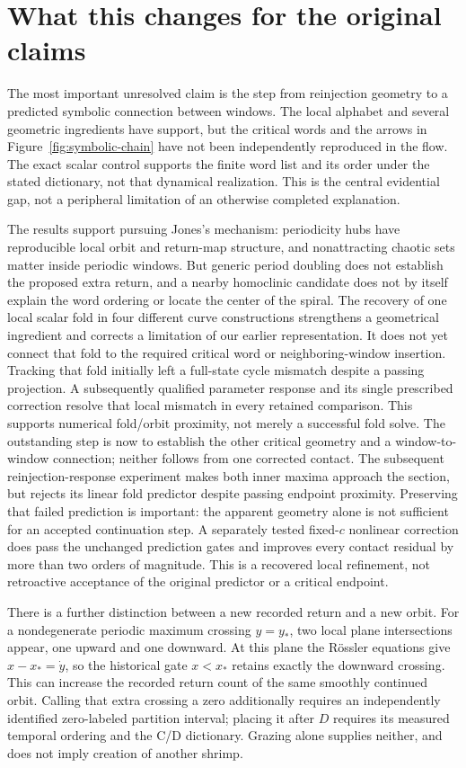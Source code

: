\section{What this changes for the original claims}
\label{sec:claims}

The most important unresolved claim is the step from reinjection geometry
to a predicted symbolic connection between windows. The local alphabet and
several geometric ingredients have support, but the critical words and the
arrows in Figure~\ref{fig:symbolic-chain} have not been independently
reproduced in the flow. The exact scalar control supports the finite word
list and its order under the stated dictionary, not that dynamical realization.
This is the central evidential gap, not a peripheral limitation
of an otherwise completed explanation.

The results support pursuing Jones's mechanism: periodicity hubs have
reproducible local orbit and return-map structure, and nonattracting chaotic
sets matter inside periodic windows. But generic period doubling does not
establish the proposed extra return, and a nearby homoclinic candidate does
not by itself explain the word ordering or locate the center of the spiral.
The recovery of one local scalar fold in four different curve constructions
strengthens a geometrical ingredient and corrects a limitation of our earlier
representation. It does not yet connect that fold to the required critical
word or neighboring-window insertion.
Tracking that fold initially left a full-state cycle mismatch despite a
passing projection. A subsequently qualified parameter response and its
single prescribed correction resolve that local mismatch in every retained
comparison. This supports numerical fold/orbit proximity, not merely a
successful fold solve. The outstanding step is now to establish the other
critical geometry and a window-to-window connection; neither follows from
one corrected contact. The subsequent reinjection-response experiment makes
both inner maxima approach the section, but rejects its linear fold predictor
despite passing endpoint proximity. Preserving that failed prediction is
important: the apparent geometry alone is not sufficient for an accepted
continuation step. A separately tested fixed-$c$ nonlinear correction does
pass the unchanged prediction gates and improves every contact residual by
more than two orders of magnitude. This is a recovered local refinement,
not retroactive acceptance of the original predictor or a critical endpoint.

There is a further distinction between a new recorded return and a new orbit.
For a nondegenerate periodic maximum crossing $y=y_*$, two local plane
intersections appear, one upward and one downward. At this plane the R\"ossler
equations give $x-x_*=\dot y$, so the historical gate $x<x_*$ retains exactly
the downward crossing. This can increase the recorded return count of the
same smoothly continued orbit. Calling that extra crossing a zero additionally
requires an independently identified zero-labeled partition interval; placing
it after $D$ requires its measured temporal ordering and the C/D dictionary.
Grazing alone supplies neither, and does not imply creation of another shrimp.

